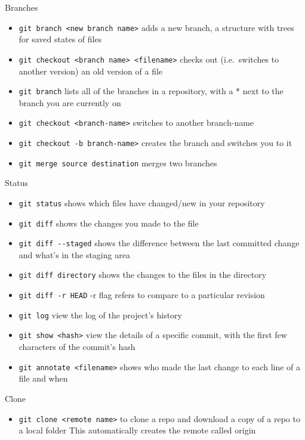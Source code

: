 \documentclass[
]{book}
\providecommand{\tightlist}{%
  \setlength{\itemsep}{0pt}\setlength{\parskip}{0pt}}
\begin{document}
Branches

\begin{itemize}
\tightlist
\item
  \texttt{git\ branch\ \textless{}new\ branch\ name\textgreater{}} adds a new branch, a structure with trees for saved states of files
\item
  \texttt{git\ checkout\ \textless{}branch\ name\textgreater{}\ \textless{}filename\textgreater{}} checks out (i.e.~switches to another version) an old version of a file
\item
  \texttt{git\ branch} lists all of the branches in a repository, with a * next to the branch you are currently on
\item
  \texttt{git\ checkout\ \textless{}branch-name\textgreater{}} switches to another branch-name
\item
  \texttt{git\ checkout\ -b\ branch-name\textgreater{}} creates the branch and switches you to it
\item
  \texttt{git\ merge\ source\ destination} merges two branches
\end{itemize}

Status

\begin{itemize}
\tightlist
\item
  \texttt{git\ status} shows which files have changed/new in your repository
\item
  \texttt{git\ diff} shows the changes you made to the file
\item
  \texttt{git\ diff\ -\/-staged} shows the difference between the last committed change and what's in the staging area
\item
  \texttt{git\ diff\ directory} shows the changes to the files in the directory
\item
  \texttt{git\ diff\ -r\ HEAD} -r flag refers to compare to a particular revision
\item
  \texttt{git\ log} view the log of the project's history
\item
  \texttt{git\ show\ \textless{}hash\textgreater{}} view the details of a specific commit, with the first few characters of the commit's hash
\item
  \texttt{git\ annotate\ \textless{}filename\textgreater{}} shows who made the last change to each line of a file and when
\end{itemize}

Clone

\begin{itemize}
\tightlist
\item
  \texttt{git\ clone\ \textless{}remote\ name\textgreater{}} to clone a repo and download a copy of a repo to a local folder This automatically creates the remote called origin
\end{itemize}
\end{document}
